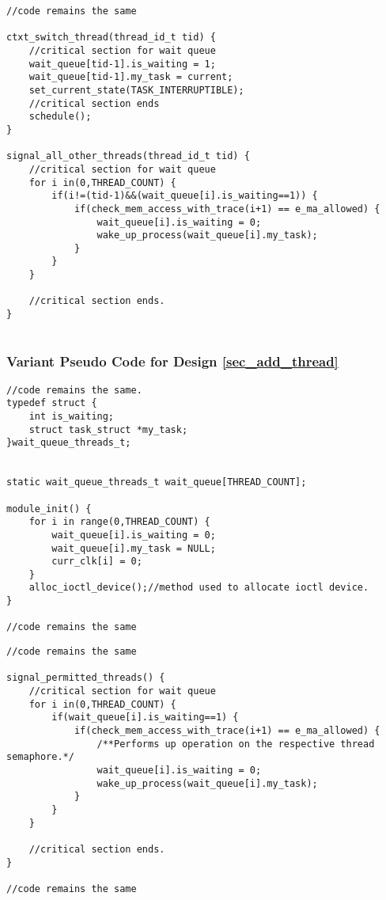 \begin{lstlisting}[title=Kernel Space - IOCTL, style=customc]
//code remains the same

ctxt_switch_thread(thread_id_t tid) {	
	//critical section for wait queue
	wait_queue[tid-1].is_waiting = 1;
	wait_queue[tid-1].my_task = current;
	set_current_state(TASK_INTERRUPTIBLE);
	//critical section ends
	schedule();
}

signal_all_other_threads(thread_id_t tid) {
	//critical section for wait queue
	for i in(0,THREAD_COUNT) {
		if(i!=(tid-1)&&(wait_queue[i].is_waiting==1)) {
			if(check_mem_access_with_trace(i+1) == e_ma_allowed) {
				wait_queue[i].is_waiting = 0;
				wake_up_process(wait_queue[i].my_task);				
			}		
		}
	}	
	
	//critical section ends.
}


\end{lstlisting}

\subsubsection*{Variant Pseudo Code for Design \ref{sec_add_thread}}

\begin{lstlisting}[title=Kernel Space - General module definitions, style=customc]
//code remains the same.
typedef struct {
	int is_waiting;
	struct task_struct *my_task;
}wait_queue_threads_t;


static wait_queue_threads_t wait_queue[THREAD_COUNT];

module_init() {
	for i in range(0,THREAD_COUNT) {
		wait_queue[i].is_waiting = 0; 
		wait_queue[i].my_task = NULL;
		curr_clk[i] = 0;
	}
	alloc_ioctl_device();//method used to allocate ioctl device.
}

//code remains the same
\end{lstlisting}

\begin{lstlisting}[title=Kernel Space - General module definitions, style=customc]
//code remains the same

signal_permitted_threads() {
	//critical section for wait queue
	for i in(0,THREAD_COUNT) {
		if(wait_queue[i].is_waiting==1) {
			if(check_mem_access_with_trace(i+1) == e_ma_allowed) {
				/**Performs up operation on the respective thread semaphore.*/
				wait_queue[i].is_waiting = 0;
				wake_up_process(wait_queue[i].my_task);	
			}		
		}
	}	
	
	//critical section ends.
}

//code remains the same
\end{lstlisting}
